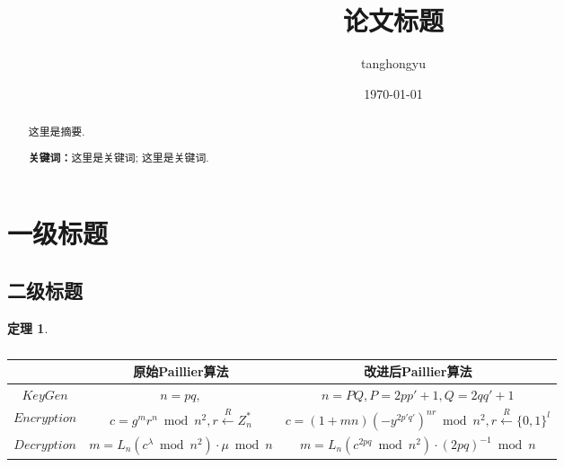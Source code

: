 \documentclass[12pt, a4paper, oneside]{ctexart}
\title{\textbf{论文标题}}
\author{tanghongyu}
\date{\today}
\newtheorem{theorem}{定理}[section]
\begin{document}
\maketitle

\setcounter{page}{0}
\maketitle
\thispagestyle{empty}

\begin{abstract}
    这里是摘要.
    \par\textbf{关键词：}这里是关键词; 这里是关键词.
\end{abstract}

\newpage
{}
\setcounter{page}{1}
\tableofcontents
\newpage
\setcounter{page}{1}

\section{一级标题}

\subsection{二级标题}

\begin{theorem}

\end{theorem}

\begin{table}[htbp]
    \centering  %
    \caption{ }  %
    \label{tab2}  %
    \begin{adjustbox}{max width=\textwidth}
        \begin{tabular}{|c|c|c|}
            \hline
            $ $          & 原始Paillier算法                                                  & 改进后Paillier算法                                                                 \\
            \hline
            $KeyGen$     & $ n = pq ,$                                                   & $ n = PQ,P=2pp'+1, Q=2qq'+1$                                                  \\
            \hline
            $Encryption$ & $c = g^{m}r^{n} \bmod n^2,r \stackrel{R}{\leftarrow} {Z_n^*}$ & $ c = (1+mn)(-y^{2p'q'})^{nr} \bmod n^2,r \stackrel{R}{\leftarrow} \{0,1\}^l$ \\
            \hline
            $Decryption$ & $m = L_n(c^{\lambda }\bmod n^2)\cdot \mu \bmod n$             & $m = L_n(c^{2pq} \bmod n^2)\cdot (2pq)^{-1} \bmod n $                         \\
            \hline
        \end{tabular}
    \end{adjustbox}
\end{table}
\end{document}
